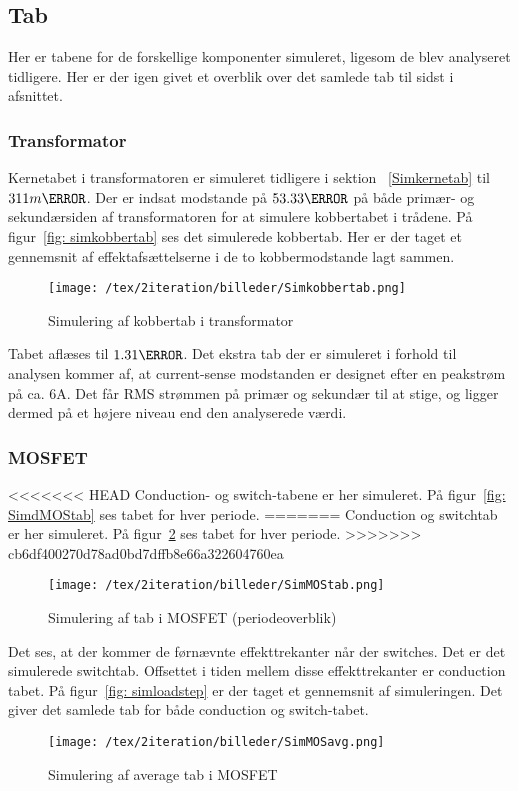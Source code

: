   

\subsection{Tab}
Her er tabene for de forskellige komponenter simuleret, ligesom de blev analyseret tidligere. Her er der igen givet et overblik over det samlede tab til sidst i afsnittet.

\subsubsection{Transformator}
Kernetabet i transformatoren er simuleret tidligere i sektion ~\ref{Simkernetab} til $311m\watt$. Der er indsat modstande på $53.33\ohm$ på både primær- og sekundærsiden af transformatoren for at simulere kobbertabet i trådene. På figur~\ref{fig: simkobbertab} ses det simulerede kobbertab. Her er der taget et gennemsnit af effektafsættelserne i de to kobbermodstande lagt sammen. 
\begin{figure}[H]
	\center
	\texttt{[image: /tex/2iteration/billeder/Simkobbertab.png]}
	\caption{Simulering af kobbertab i transformator}
	\label{fig: Simkobbertab}
\end{figure}

Tabet aflæses til $1.31\watt$. Det ekstra tab der er simuleret i forhold til analysen kommer af, at current-sense modstanden er designet efter en peakstrøm på ca. 6A. Det får RMS strømmen på primær og sekundær til at stige, og ligger dermed på et højere niveau end den analyserede værdi.

\subsubsection{MOSFET} \label{MOSFETsimtab}
<<<<<<< HEAD
\noindent Conduction- og switch-tabene er her simuleret. På figur~\ref{fig: SimdMOStab} ses tabet for hver periode.
=======
Conduction og switchtab er her simuleret. På figur~\ref{fig: SimMOStab} ses tabet for hver periode.
>>>>>>> cb6df400270d78ad0bd7dffb8e66a322604760ea
\begin{figure}[H]
	\center
	\texttt{[image: /tex/2iteration/billeder/SimMOStab.png]}
	\caption{Simulering af tab i MOSFET (periodeoverblik)}
	\label{fig: SimMOStab}
\end{figure} 

Det ses, at der kommer de førnævnte effekttrekanter når der switches. Det er det simulerede switchtab. Offsettet i tiden mellem disse effekttrekanter er conduction tabet.
På figur~\ref{fig: simloadstep} er der taget et gennemsnit af simuleringen. Det giver det samlede tab for både conduction og switch-tabet. 
\begin{figure}[H]
	\center
	\texttt{[image: /tex/2iteration/billeder/SimMOSavg.png]}
	\caption{Simulering af average tab i MOSFET}
	\label{fig: SimMOSavg}
\end{figure} 

